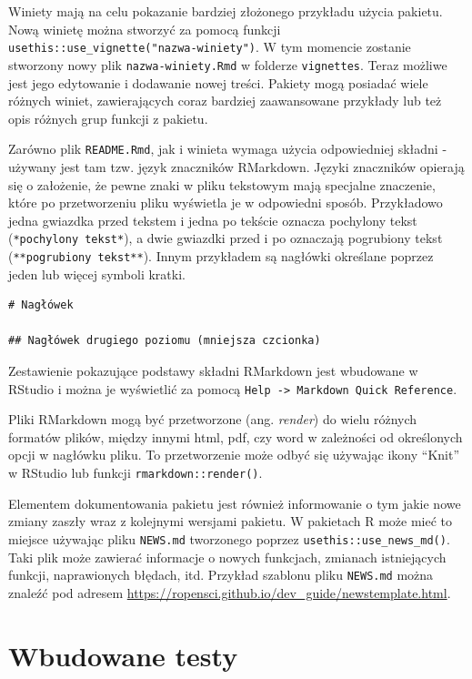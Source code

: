 \documentclass[paper=6in:9in,pagesize=pdftex,headinclude=on,footinclude=on,10pt]{scrbook}
\begin{document}
Winiety mają na celu pokazanie bardziej złożonego przykładu użycia pakietu.
Nową winietę można stworzyć za pomocą funkcji \texttt{usethis::use\_vignette("nazwa-winiety")}.
W tym momencie zostanie stworzony nowy plik \texttt{nazwa-winiety.Rmd} w folderze \texttt{vignettes}.
Teraz możliwe jest jego edytowanie i dodawanie nowej treści.
Pakiety mogą posiadać wiele różnych winiet, zawierających coraz bardziej zaawansowane przykłady lub też opis różnych grup funkcji z pakietu.

Zarówno plik \texttt{README.Rmd}, jak i winieta wymaga użycia odpowiedniej składni - używany jest tam tzw. język znaczników RMarkdown.
Języki znaczników opierają się o założenie, że pewne znaki w pliku tekstowym mają specjalne znaczenie, które po przetworzeniu pliku wyświetla je w odpowiedni sposób.
Przykładowo jedna gwiazdka przed tekstem i jedna po tekście oznacza pochylony tekst (\texttt{*pochylony\ tekst*}), a dwie gwiazdki przed i po oznaczają pogrubiony tekst (\texttt{**pogrubiony\ tekst**}).
Innym przykładem są nagłówki określane poprzez jeden lub więcej symboli kratki.

\begin{verbatim}
# Nagłówek

## Nagłówek drugiego poziomu (mniejsza czcionka)
\end{verbatim}

Zestawienie pokazujące podstawy składni RMarkdown jest wbudowane w RStudio i można je wyświetlić za pomocą \texttt{Help\ -\textgreater{}\ Markdown\ Quick\ Reference}.

Pliki RMarkdown mogą być przetworzone (ang. \emph{render}) do wielu różnych formatów plików, między innymi html, pdf, czy word w zależności od określonych opcji w nagłówku pliku.
To przetworzenie może odbyć się używając ikony ``Knit'' w RStudio lub funkcji \texttt{rmarkdown::render()}.

Elementem dokumentowania pakietu jest również informowanie o tym jakie nowe zmiany zaszły wraz z kolejnymi wersjami pakietu.
W pakietach R może mieć to miejsce używając pliku \texttt{NEWS.md} tworzonego poprzez \texttt{usethis::use\_news\_md()}.
Taki plik może zawierać informacje o nowych funkcjach, zmianach istniejących funkcji, naprawionych błędach, itd.
Przykład szablonu pliku \texttt{NEWS.md} można znaleźć pod adresem \url{https://ropensci.github.io/dev_guide/newstemplate.html}.

\hypertarget{wbudowane-testy}{%
\section{Wbudowane testy}\label{wbudowane-testy}}
\end{document}
